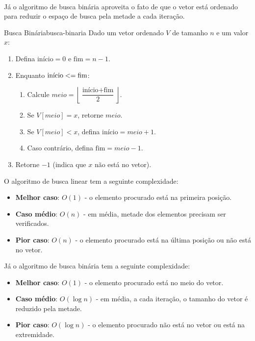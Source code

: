 \documentclass[12pt,a4paper]{article}
\def\leq{\string<=}%
\begin{document}
\paragraph{}
Já o algoritmo de busca binária aproveita o fato de que o vetor está ordenado para reduzir o espaço de busca pela metade a cada iteração.

\begin{algobox}{Busca Binária}{busca-binaria}
Dado um vetor ordenado \(V\) de tamanho \(n\) e um valor \(x\):
\begin{enumerate}\setlength{\itemsep}{2pt}
    \item Defina \(\text{início} = 0\) e \(\text{fim} = n - 1\).
    \item Enquanto \(\text{início} \leq \text{fim}\):
    \begin{enumerate}\setlength{\itemsep}{2pt}
        \item Calcule \(meio = \left\lfloor \dfrac{\text{início} + \text{fim}}{2} \right\rfloor\).
        \item Se \(V[meio] = x\), retorne \(meio\).
        \item Se \(V[meio] < x\), defina \(\text{início} = meio + 1\).
        \item Caso contrário, defina \(\text{fim} = meio - 1\).
    \end{enumerate}
    \item Retorne \(-1\) (indica que \(x\) não está no vetor).
\end{enumerate}
\end{algobox}  

O algoritmo de busca linear tem a seguinte complexidade:
\begin{itemize}\setlength{\itemsep}{2pt}
    \item \textbf{Melhor caso}: \(O(1)\) - o elemento procurado está na primeira posição.
    \item \textbf{Caso médio}: \(O(n)\) - em média, metade dos elementos precisam ser verificados.
    \item \textbf{Pior caso}: \(O(n)\) - o elemento procurado está na última posição ou não está no vetor.
\end{itemize}

Já o algoritmo de busca binária tem a seguinte complexidade:
\begin{itemize}\setlength{\itemsep}{2pt}
    \item \textbf{Melhor caso}: \(O(1)\) - o elemento procurado está no meio do vetor.
    \item \textbf{Caso médio}: \(O(\log n)\) - em média, a cada iteração, o tamanho do vetor é reduzido pela metade.
    \item \textbf{Pior caso}: \(O(\log n)\) - o elemento procurado não está no vetor ou está na extremidade.
\end{itemize}
 
\end{document}
